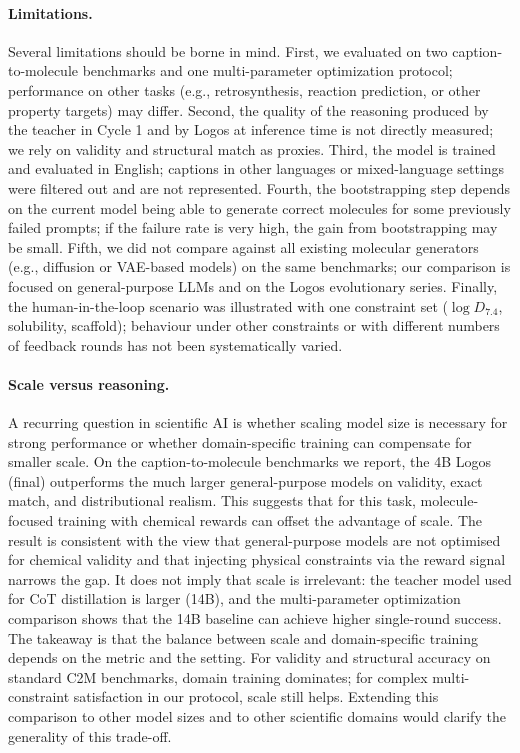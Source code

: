 \documentclass[11pt]{article}
\begin{document}
\paragraph{Limitations.}
Several limitations should be borne in mind. First, we evaluated on two caption-to-molecule benchmarks and one multi-parameter optimization protocol; performance on other tasks (e.g., retrosynthesis, reaction prediction, or other property targets) may differ. Second, the quality of the reasoning produced by the teacher in Cycle 1 and by Logos at inference time is not directly measured; we rely on validity and structural match as proxies. Third, the model is trained and evaluated in English; captions in other languages or mixed-language settings were filtered out and are not represented. Fourth, the bootstrapping step depends on the current model being able to generate correct molecules for some previously failed prompts; if the failure rate is very high, the gain from bootstrapping may be small. Fifth, we did not compare against all existing molecular generators (e.g., diffusion or VAE-based models\cite{vignac2022digress,gomez2018automatic}) on the same benchmarks; our comparison is focused on general-purpose LLMs and on the Logos evolutionary series. Finally, the human-in-the-loop scenario was illustrated with one constraint set ($\log D_{7.4}$, solubility, scaffold); behaviour under other constraints or with different numbers of feedback rounds has not been systematically varied.

\paragraph{Scale versus reasoning.}
A recurring question in scientific AI is whether scaling model size is necessary for strong performance or whether domain-specific training can compensate for smaller scale. On the caption-to-molecule benchmarks we report, the 4B Logos (final) outperforms the much larger general-purpose models on validity, exact match, and distributional realism. This suggests that for this task, molecule-focused training with chemical rewards can offset the advantage of scale. The result is consistent with the view that general-purpose models are not optimised for chemical validity and that injecting physical constraints via the reward signal narrows the gap. It does not imply that scale is irrelevant: the teacher model used for CoT distillation is larger (14B), and the multi-parameter optimization comparison shows that the 14B baseline can achieve higher single-round success. The takeaway is that the balance between scale and domain-specific training depends on the metric and the setting. For validity and structural accuracy on standard C2M benchmarks, domain training dominates; for complex multi-constraint satisfaction in our protocol, scale still helps. Extending this comparison to other model sizes and to other scientific domains would clarify the generality of this trade-off.
\end{document}
